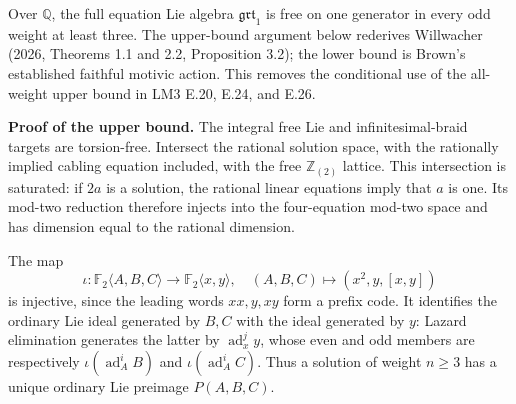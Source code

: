 \documentclass[10pt,a4paper]{article}
\begin{document}
\nopagebreak[4]

Over \(\mathbb Q\), the full equation Lie algebra \(\mathfrak{grt}_1\) is free on one generator in every odd weight at least three. The upper-bound argument below rederives Willwacher (2026, Theorems 1.1 and 2.2, Proposition 3.2); the lower bound is Brown's established faithful motivic action. This removes the conditional use of the all-weight upper bound in LM3 E.20, E.24, and E.26.

\textbf{Proof of the upper bound.} The integral free Lie and infinitesimal-braid targets are torsion-free. Intersect the rational solution space, with the rationally implied cabling equation included, with the free \(\mathbb Z_{(2)}\) lattice. This intersection is saturated: if \(2a\) is a solution, the rational linear equations imply that \(a\) is one. Its mod-two reduction therefore injects into the four-equation mod-two space and has dimension equal to the rational dimension.

The map \[
\iota:\mathbb F_2\langle A,B,C\rangle\longrightarrow
\mathbb F_2\langle x,y\rangle,
\quad (A,B,C)\mapsto(x^2,y,[x,y])
\] is injective, since the leading words \(xx,y,xy\) form a prefix code. It identifies the ordinary Lie ideal generated by \(B,C\) with the ideal generated by \(y\): Lazard elimination generates the latter by \(\operatorname{ad}_x^j y\), whose even and odd members are respectively \(\iota(\operatorname{ad}_A^iB)\) and \(\iota(\operatorname{ad}_A^iC)\). Thus a solution of weight \(n\geq3\) has a unique ordinary Lie preimage \(P(A,B,C)\).
\end{document}
